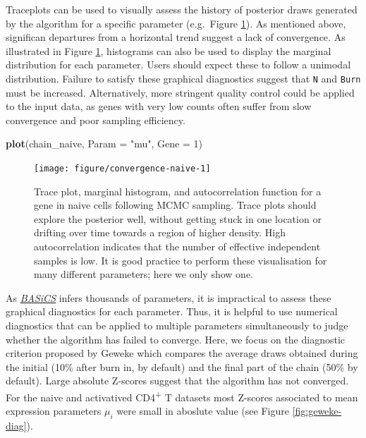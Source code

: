 \documentclass[9pt,a4paper,]{extarticle}
\newenvironment{Shaded}{\begin{snugshade}}{\end{snugshade}}
\newcommand{\DataTypeTok}[1]{\textcolor[rgb]{0.13,0.29,0.53}{#1}}
\newcommand{\DecValTok}[1]{\textcolor[rgb]{0.00,0.00,0.81}{#1}}
\newcommand{\KeywordTok}[1]{\textcolor[rgb]{0.13,0.29,0.53}{\textbf{#1}}}
\newcommand{\NormalTok}[1]{#1}
\newcommand{\StringTok}[1]{\textcolor[rgb]{0.31,0.60,0.02}{#1}}
\begin{document}
Traceplots can be used to visually assess the history of posterior draws
generated by the algorithm for a specific parameter (e.g.~Figure
\ref{fig:convergence-naive}).
As mentioned above, significan departures from a horizontal trend suggest a
lack of convergence.
As illustrated in Figure \ref{fig:convergence-naive}, histograms can also be
used to display the marginal distribution for each parameter.
Users should expect these to follow a unimodal distribution.
Failure to satisfy these graphical diagnostics suggest that \texttt{N} and \texttt{Burn} must
be increased.
Alternatively, more stringent quality control could be applied to the input
data, as genes with very low counts often suffer from slow convergence and poor sampling efficiency.

\begin{Shaded}
\begin{Highlighting}[]
\KeywordTok{plot}\NormalTok{(chain_naive, }\DataTypeTok{Param =} \StringTok{"mu"}\NormalTok{, }\DataTypeTok{Gene =} \DecValTok{1}\NormalTok{)}
\end{Highlighting}
\end{Shaded}

\begin{figure}

{\centering \texttt{[image: figure/convergence-naive-1]} 

}

\caption{Trace plot, marginal histogram, and autocorrelation function for a gene in naive cells following MCMC sampling. Trace plots should explore the posterior well, without getting stuck in one location or drifting over time towards a region of higher density. High autocorrelation indicates that the number of effective independent samples is low. It is good practice to perform these visualisation for many different parameters; here we only show one.}\label{fig:convergence-naive}
\end{figure}

As \emph{\href{https://bioconductor.org/packages/3.11/BASiCS}{BASiCS}} infers thousands of parameters, it is
impractical to assess these graphical diagnostics for each parameter.
Thus, it is helpful to use numerical diagnostics that can be applied to multiple
parameters simultaneously to judge whether the algorithm has failed to converge.
Here, we focus on the diagnostic criterion proposed by Geweke \citep{Geweke1995}
which compares the average draws obtained during the initial (10\% after burn
in, by default) and the final part of the chain (50\% by default).
Large absolute Z-scores suggest that the algorithm has not converged.
For the naive and activatived CD4\textsuperscript{+} T datasets most Z-scores associated to mean
expression parameters \(\mu_i\) were small in aboslute value (see Figure \ref{fig:geweke-diag}).
\end{document}
